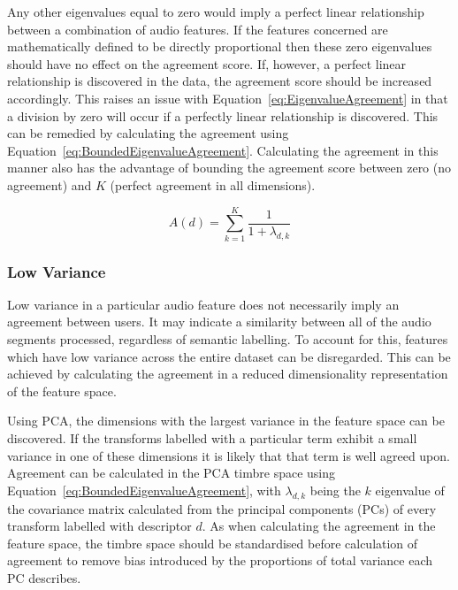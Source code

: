 			Any other eigenvalues equal to zero would imply a perfect linear relationship between a combination
			of audio features. If the features concerned are mathematically defined to be directly proportional
			then these zero eigenvalues should have no effect on the agreement score. If, however, a perfect
			linear relationship is discovered in the data, the agreement score should be increased
			accordingly. This raises an issue with Equation~\ref{eq:EigenvalueAgreement} in that a division by
			zero will occur if a perfectly linear relationship is discovered. This can be remedied by
			calculating the agreement using Equation~\ref{eq:BoundedEigenvalueAgreement}. Calculating the
			agreement in this manner also has the advantage of bounding the agreement score between zero (no
			agreement) and $K$ (perfect agreement in all dimensions).

			\begin{equation}
				A(d) = \sum_{k = 1}^{K} \frac{1}{1 + \lambda_{d,k}}
				\label{eq:BoundedEigenvalueAgreement}
			\end{equation}

		\subsubsection*{Low Variance}
			Low variance in a particular audio feature does not necessarily imply an agreement between users.
			It may indicate a similarity between all of the audio segments processed, regardless of semantic
			labelling. To account for this, features which have low variance across the entire dataset can be
			disregarded. This can be achieved by calculating the agreement in a reduced dimensionality
			representation of the feature space.

			Using PCA, the dimensions with the largest variance in the feature space can be discovered. If the
			transforms labelled with a particular term exhibit a small variance in one of these dimensions it
			is likely that that term is well agreed upon. Agreement can be calculated in the PCA timbre space
			using Equation~\ref{eq:BoundedEigenvalueAgreement}, with $\lambda_{d,k}$ being the $k$
			eigenvalue of the covariance matrix calculated from the principal components (PCs) of every
			transform labelled with descriptor $d$. As when calculating the agreement in the feature space, the
			timbre space should be standardised before calculation of agreement to remove bias introduced by
			the proportions of total variance each PC describes.

